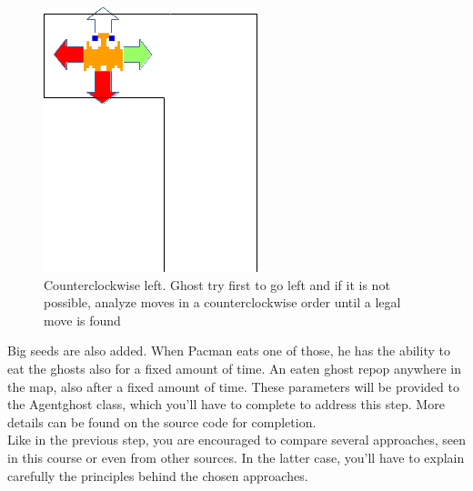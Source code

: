 \documentclass[12pt,a4paper,BCOR12mm, headexclude, footexclude, twoside, openright]{scrartcl}
\numberwithin{equation}{section} %
\numberwithin{figure}{section} %
\numberwithin{table}{section} %
\begin{document}
\begin{figure}
	\label{counterclockwise}
	\begin{center}
	
	\includegraphics[scale=1]{ghostclockwiseleft.png}
    \caption{Counterclockwise left. Ghost try first to go left and if it is not possible, analyze moves in a counterclockwise order until a legal move is found}
    \end{center}
\end{figure}



Big seeds are also added. When Pacman eats one of those, he has the ability to eat the ghosts also for a fixed amount of time. An eaten ghost repop anywhere in the map, also after a fixed amount of time. These parameters will be provided to the Agentghost class, which you'll have to complete to address this step. More details can be found on the source code for completion.\\

Like in the previous step, you are encouraged to compare several approaches, seen in this course or even from other sources. In the latter case, you'll have to explain carefully the principles behind the chosen approaches.
\end{document}
